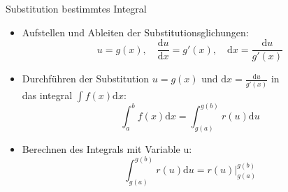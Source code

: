 \begin{theorem}{Substitution bestimmtes Integral}\\
    \begin{itemize}
	\item Aufstellen und Ableiten der Substitutionsglichungen:
	    \[u=g(x),\quad \frac{\mathrm{d}u}{\mathrm{d}x}=g'(x),\quad \mathrm{d}x = \frac{\mathrm{d}u}{g'(x)} \]
	\item Durchführen der Substitution \(u=g(x) \)	 und \(\mathrm{d}x=\frac{\mathrm{d}u}{g'(x)} \) in \\das  
	    integral \(\displaystyle\int{f(x)\mathrm{d}x}\):
	    \[\int_a^b{f(x)\mathrm{d}x}=\int_{g(a)}^{g(b)}{r(u)}{\mathrm{d}u} \]
	\item Berechnen des Integrals mit Variable u:
	    \[\int_{g(a)}^{g(b)}{r(u)\mathrm{d}u}=r(u)\Big|_{g(a)}^{g(b)} \]

    \end{itemize}	
\end{theorem}














